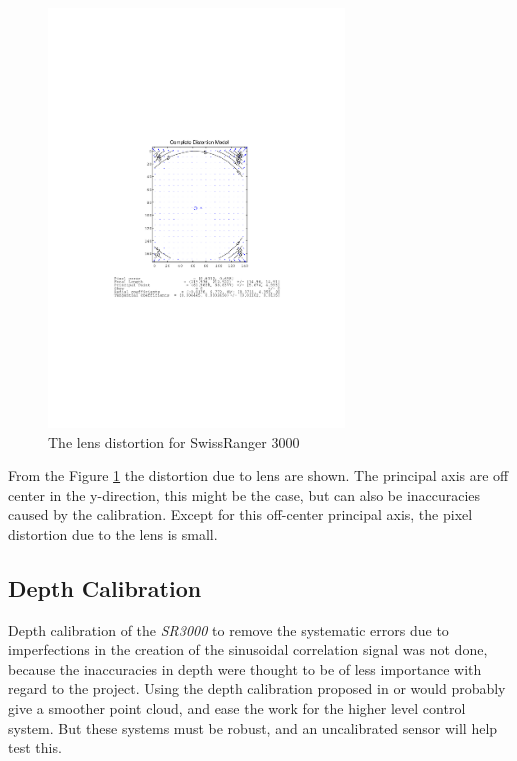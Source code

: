 \begin{figure}[htbp]
    \centering
    \includegraphics[width=0.7\textwidth]{pics/sr3000_comp_dist}
    \caption{The lens distortion for SwissRanger 3000}
    \label{chap3:fig-sr3000-comp-lensdist}
\end{figure}
From the Figure \ref{chap3:fig-sr3000-comp-lensdist} the distortion due to lens are shown.
The principal axis are off center in the y-direction, this might be the case, but can also
be inaccuracies caused by the calibration. Except for this off-center principal axis, the
pixel distortion due to the lens is small.


\subsection{Depth Calibration}
Depth calibration of the \emph{SR3000} to remove the systematic errors due to
imperfections in the creation of the sinusoidal correlation signal was not done, 
because the inaccuracies in depth
were thought to be of less importance with regard to the project. Using the depth
calibration proposed in \cite{sr3000} or \cite{tof-calibration} would probably give a
smoother point cloud, and ease the work for the higher level control system. But these
systems must be robust, and an uncalibrated sensor will help test this. 



